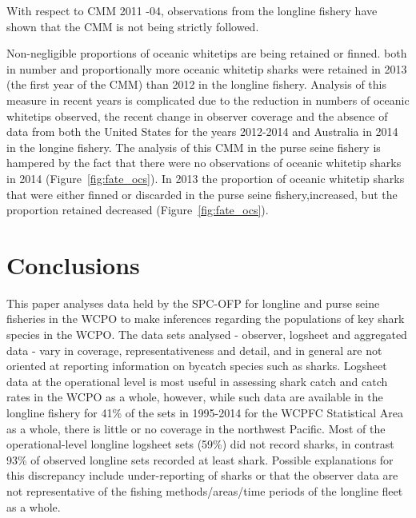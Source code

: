 \documentclass[12pt]{SCreport}
\begin{document}
With respect to CMM 2011 -04, observations from the longline  fishery have shown that the CMM is not being strictly followed. 

Non-negligible proportions of oceanic whitetips are being retained or finned. both in number and proportionally more oceanic whitetip sharks were retained in 2013 (the first year of the CMM) than 2012 in the longline fishery.   Analysis of this measure in recent years is complicated due to the reduction in numbers of oceanic whitetips observed, the recent change in observer coverage and  the absence of data from both the United States for the years 2012-2014  and Australia in 2014 in the longine fishery.   The analysis of this CMM in the purse seine fishery is hampered by the fact that there were no observations of oceanic whitetip sharks in 2014 (Figure~\ref{fig:fate_ocs}).    In 2013 the proportion of oceanic whitetip sharks that were either finned or discarded in the purse seine fishery,increased, but the proportion retained decreased (Figure~\ref{fig:fate_ocs}).

 

\section{Conclusions }

This paper analyses data held by the SPC-OFP for longline and purse seine fisheries in the WCPO to make inferences regarding the populations of key shark species in the WCPO. The data sets analysed - observer, logsheet and aggregated data - vary in coverage, representativeness and detail, and in general are not oriented at reporting information on bycatch species such as sharks. Logsheet data at the operational level is most useful in assessing shark catch and catch rates in the WCPO as a whole, however, while such data are available in the longline fishery for 41\% of the sets in 1995-2014 for the WCPFC Statistical Area as a whole, there is little or no coverage in the northwest Pacific. Most of the operational-level longline logsheet sets (59\%) did not record sharks, in contrast 93\% of observed longline sets recorded at least shark.  Possible explanations for this discrepancy include under-reporting of sharks or that the observer data are not representative of the fishing methods/areas/time periods of the longline fleet as a whole.
\end{document}
